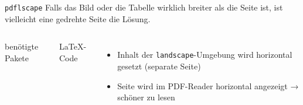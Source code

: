 \begin{frame}[fragile]{\texttt{pdflscape}}
  Falls das Bild oder die Tabelle wirklich breiter als die Seite ist, ist vielleicht eine gedrehte Seite die Lösung.
  \begin{columns}[T]
    \begin{block}{benötigte Pakete}
      \begin{lstverbatim}
      \end{lstverbatim}
    \end{block}
    \begin{block}{\LaTeX-Code}
      \begin{lstverbatim}
      \begin{landscape}
        \begin{table}
        \end{table}
      \end{landscape}
      \end{lstverbatim}
    \end{block}
    \begin{itemize}
      \item Inhalt der \texttt{landscape}-Umgebung wird horizontal gesetzt (separate Seite)
      \item Seite wird im PDF-Reader horizontal angezeigt → schöner zu lesen
    \end{itemize}
  \end{columns}
\end{frame}

